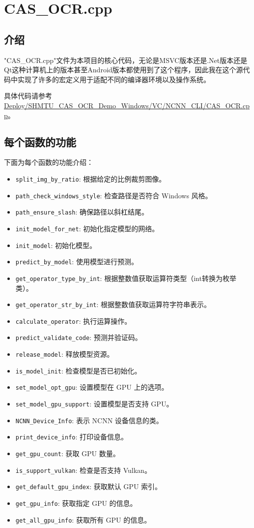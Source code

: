 \section{CAS\_OCR.cpp}

\subsection{介绍}

"CAS\_OCR.cpp"文件为本项目的核心代码，无论是MSVC版本还是.Net版本还是Qt这种计算机上的版本甚至Android版本都使用到了这个程序，因此我在这个源代码中实现了许多的宏定义用于适配不同的编译器环境以及操作系统。

具体代码请参考\url{Deploy/SHMTU_CAS_OCR_Demo_Windows/VC/NCNN_CLI/CAS_OCR.cpp}。

\subsection{每个函数的功能}

下面为每个函数的功能介绍：

\begin{itemize}
	\item \texttt{split\_img\_by\_ratio}: 根据给定的比例裁剪图像。
	\item \texttt{path\_check\_windows\_style}: 检查路径是否符合 Windows 风格。
	\item \texttt{path\_ensure\_slash}: 确保路径以斜杠结尾。
	\item \texttt{init\_model\_for\_net}: 初始化指定模型的网络。
	\item \texttt{init\_model}: 初始化模型。
	\item \texttt{predict\_by\_model}: 使用模型进行预测。
	\item \texttt{get\_operator\_type\_by\_int}: 根据整数值获取运算符类型（int转换为枚举类）。
	\item \texttt{get\_operator\_str\_by\_int}: 根据整数值获取运算符字符串表示。
	\item \texttt{calculate\_operator}: 执行运算操作。
	\item \texttt{predict\_validate\_code}: 预测并验证码。
	\item \texttt{release\_model}: 释放模型资源。
	\item \texttt{is\_model\_init}: 检查模型是否已初始化。
	\item \texttt{set\_model\_opt\_gpu}: 设置模型在 GPU 上的选项。
	\item \texttt{set\_model\_gpu\_support}: 设置模型是否支持 GPU。
	\item \texttt{NCNN\_Device\_Info}: 表示 NCNN 设备信息的类。
	\item \texttt{print\_device\_info}: 打印设备信息。
	\item \texttt{get\_gpu\_count}: 获取 GPU 数量。
	\item \texttt{is\_support\_vulkan}: 检查是否支持 Vulkan。
	\item \texttt{get\_default\_gpu\_index}: 获取默认 GPU 索引。
	\item \texttt{get\_gpu\_info}: 获取指定 GPU 的信息。
	\item \texttt{get\_all\_gpu\_info}: 获取所有 GPU 的信息。
\end{itemize}

